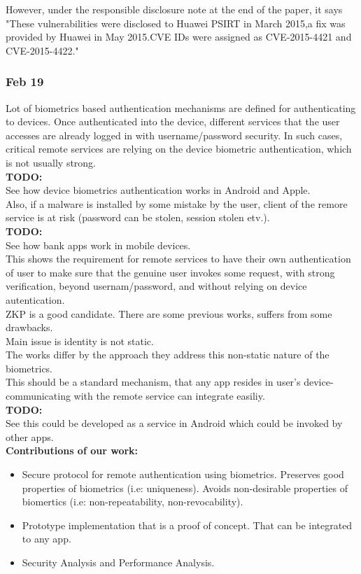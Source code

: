 \documentclass[11pt]{article}
\begin{document}
However, under the responsible disclosure note at the end of the paper, it says "These vulnerabilities were disclosed to Huawei PSIRT in March 2015,a 
fix was provided by Huawei in May 2015.CVE IDs were assigned as CVE-2015-4421 and CVE-2015-4422."

\subsubsection*{Feb 19}
Lot of biometrics based authentication mechanisms are defined for authenticating to devices. Once authenticated into the device, different services 
that the user accesses are already logged in with username/password security. In such cases, critical remote services are relying on the device 
biometric authentication, which is not usually strong.\\
\textbf{TODO:} \\ See how device biometrics authentication works in Android and Apple.\\
Also, if a malware is installed by some mistake by the user, client of the remore service is at risk (password can be stolen, session stolen etv.).\\ 
\textbf{TODO:}\\
See how bank apps work in mobile devices.\\

This shows the requirement for remote services to have their own authentication of user to make sure that the genuine user invokes some request, with 
strong verification, beyond usernam/password, and without relying on device autentication.\\
ZKP is a good candidate. There are some previous works, suffers from some drawbacks.\\ Main issue is identity is not static.\\
The works differ by the approach they address this non-static nature of the biometrics.\\

This should be a standard mechanism, that any app resides in user's device-communicating with the remote service can integrate easiliy.\\
\textbf{TODO:}\\
See this could be developed as a service in Android which could be invoked by other apps.\\

\textbf{Contributions of our work:}
\begin{itemize}
 \item Secure protocol for remote authentication using biometrics. Preserves good properties of biometrics (i.e: uniqueness). Avoids non-desirable 
properties of biomertics (i.e: non-repeatability, non-revocability).
 \item Prototype implementation that is a proof of concept. That can be integrated to any app.
 \item Security Analysis and Performance Analysis.
\end{itemize}
\end{document}
